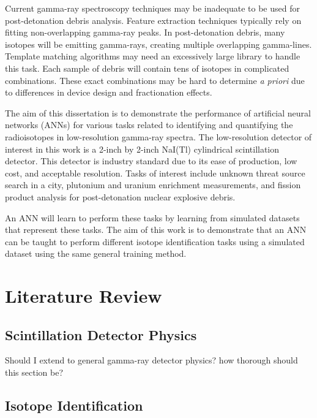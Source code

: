 \documentclass[thesis,tocnosub,noragright,centerchapter,12pt,fullpage]{uiucecethesis09}
\begin{document}
Current gamma-ray spectroscopy techniques may be inadequate to be used for post-detonation debris analysis. Feature extraction techniques typically rely on fitting non-overlapping gamma-ray peaks. In post-detonation debris, many isotopes will be emitting gamma-rays, creating multiple overlapping gamma-lines. Template matching algorithms may need an excessively large library to handle this task. Each sample of debris will contain tens of isotopes in complicated combinations. These exact combinations may be hard to determine  \textit{a priori} due to differences in device design and fractionation effects. 








The aim of this dissertation is to demonstrate the performance of artificial neural networks (ANNs) for various tasks related to identifying and quantifying the radioisotopes in low-resolution gamma-ray spectra. The low-resolution detector of interest in this work is a 2-inch by 2-inch NaI(Tl) cylindrical scintillation detector. This detector is industry standard due to its ease of production, low cost, and acceptable resolution. Tasks of interest include unknown threat source search in a city, plutonium and uranium enrichment measurements, and fission product analysis for post-detonation nuclear explosive debris. 

An ANN will learn to perform these tasks by learning from simulated datasets that represent these tasks. The aim of this work is to demonstrate that an ANN can be taught to perform different isotope identification tasks using a simulated dataset using the same general training method.









\chapter{Literature Review}


\section{Scintillation Detector Physics}

Should I extend to general gamma-ray detector physics? how thorough should this section be?


\section{Isotope Identification}
\end{document}
